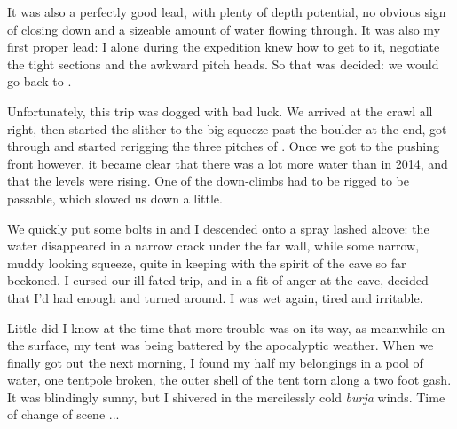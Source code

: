 It was also a perfectly good lead, with plenty of depth potential, no obvious sign of closing down and a sizeable amount of water flowing through. It was also my first proper lead: I alone during the expedition knew how to get to it, negotiate the tight sections and the awkward pitch heads. So that was decided: we would go back to . 

Unfortunately, this trip was dogged with bad luck. We arrived at the  crawl all right, then started the slither to the big squeeze past the boulder at the end, got through and started rerigging the three pitches of . Once we got to the pushing front however, it became clear that there was a lot more water than in 2014, and that the levels were rising. One of the down-climbs had to be rigged to be passable, which slowed us down a little.

We quickly put some bolts in and I descended onto a spray lashed alcove: the water disappeared in a narrow crack under the far wall, while some narrow, muddy looking squeeze, quite in keeping with the spirit of the cave so far beckoned. I cursed our ill fated trip, and in a fit of anger at the cave, decided that I'd had enough and turned around. I was wet again, tired and irritable. 

Little did I know at the time that more trouble was on its way, as meanwhile on the surface, my tent was being battered by the apocalyptic weather. When we finally got out the next morning, I found my half my belongings in a pool of water,  one tentpole broken, the outer shell of the tent torn along a two foot gash. It was blindingly sunny, but I shivered in the mercilessly cold \emph{burja} winds. Time of change of scene ...


